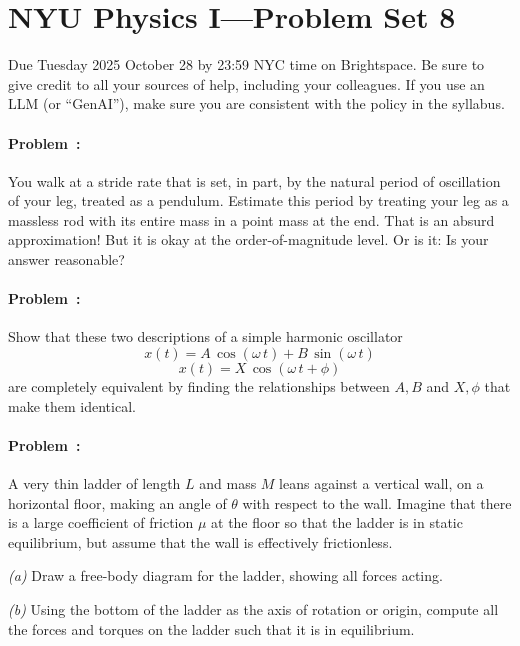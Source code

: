 \documentclass[12pt]{article}
\begin{document}
\section*{NYU Physics I---Problem Set 8}

Due Tuesday 2025 October 28 by 23:59 NYC time on Brightspace.
Be sure to give credit to all your sources of help, including your colleagues.
If you use an LLM (or ``GenAI''),
make sure you are consistent with the policy in the syllabus.

\paragraph{Problem~\theproblem:}%
You walk at a stride rate that is set, in part, by the natural period of
oscillation of your leg, treated as a pendulum.  Estimate this
period by treating your leg as a massless rod with its entire mass in a point mass at
the end. That is an absurd approximation! But it is okay at the order-of-magnitude
level. Or is it: Is your answer reasonable?

\paragraph{Problem~\theproblem:}%
Show that these two descriptions of a simple harmonic oscillator
\begin{equation}
x(t) = A\,\cos(\omega\,t) + B\,\sin(\omega\,t)
\end{equation}
\begin{equation}
x(t) = X\,\cos (\omega\,t+\phi)
\end{equation}
are completely equivalent by finding the relationships between $A, B$
and $X, \phi$ that make them identical.

\paragraph{Problem~\theproblem:}%
A very thin ladder of length $L$ and mass $M$ leans against a vertical
wall, on a horizontal floor, making an angle of $\theta$ with respect
to the wall.  Imagine that there is a large coefficient of friction
$\mu$ at the floor so that the ladder is in static
equilibrium, but assume that the wall is effectively frictionless.

\textsl{(a)} Draw a free-body diagram for the ladder, showing all
forces acting.

\textsl{(b)} Using the bottom of the ladder as the axis of rotation or
origin, compute all the forces and torques on the ladder such that it
is in equilibrium.
\end{document}

